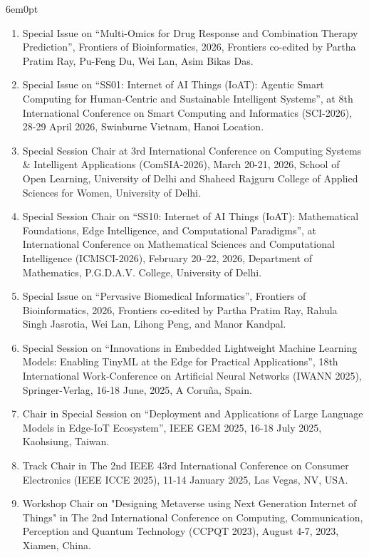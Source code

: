 \documentclass[11pt,a4paper]{moderncv}
\begin{document}
\begin{adjustwidth}{6em}{0pt}
\begin{enumerate}
		\item Special Issue on “Multi-Omics for Drug Response and Combination Therapy Prediction”, Frontiers of Bioinformatics, 2026, Frontiers co-edited by Partha Pratim Ray, Pu-Feng Du, Wei Lan, Asim Bikas Das. 
	
		\item Special Issue on “SS01: Internet of AI Things (IoAT): Agentic Smart Computing for Human-Centric and Sustainable Intelligent Systems”, at 8th International Conference on Smart Computing and Informatics (SCI-2026), 28-29 April 2026, Swinburne Vietnam, Hanoi Location. 
	
		\item Special Session Chair at 3rd International Conference on Computing Systems \& Intelligent Applications (ComSIA-2026), March 20-21, 2026, School of Open Learning, University of Delhi and Shaheed Rajguru College of Applied Sciences for Women, University of Delhi.
		
		\item Special Session Chair on “SS10: Internet of AI Things (IoAT): Mathematical Foundations, Edge Intelligence, and Computational Paradigms”, at International Conference on Mathematical Sciences and Computational Intelligence (ICMSCI-2026), February 20–22, 2026, Department of Mathematics, P.G.D.A.V. College, University of Delhi.
		
		\item Special Issue on “Pervasive Biomedical Informatics”, Frontiers of Bioinformatics, 2026, Frontiers co-edited by Partha Pratim Ray, Rahula Singh Jasrotia, Wei Lan, Lihong Peng, and Manor Kandpal.
		
		\item Special Session on “Innovations in Embedded Lightweight Machine Learning Models: Enabling TinyML at the Edge for Practical Applications”, 18th International Work-Conference on Artificial Neural Networks (IWANN 2025), Springer-Verlag, 16-18 June, 2025, A Coruña, Spain.
		
		\item Chair in Special Session on “Deployment and Applications of Large Language Models in Edge-IoT Ecosystem”, IEEE GEM 2025, 16-18 July 2025, Kaohsiung, Taiwan.
		
		\item Track Chair in The 2nd IEEE 43rd International Conference on Consumer Electronics (IEEE ICCE 2025), 11-14 January 2025, Las Vegas, NV, USA.
		
		\item Workshop Chair on "Designing Metaverse using Next Generation Internet of Things" in The 2nd International Conference on Computing, Communication, Perception and Quantum Technology (CCPQT 2023), August 4-7, 2023, Xiamen, China.
		

\end{enumerate}
\end{adjustwidth}
\end{document}
